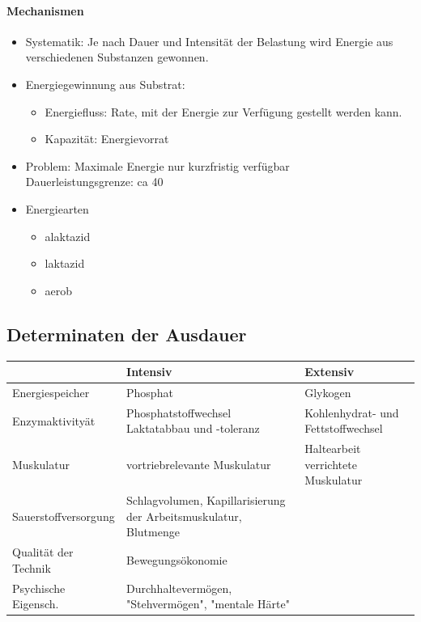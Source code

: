 \paragraph{Mechanismen}
\begin{itemize}
  \item Systematik: Je nach Dauer und Intensität der Belastung wird Energie aus verschiedenen Substanzen gewonnen.
  \item Energiegewinnung aus Substrat:
    \begin{itemize}
      \item Energiefluss: Rate, mit der Energie zur Verfügung gestellt werden kann.
      \item Kapazität: Energievorrat
    \end{itemize}
  \item Problem: Maximale Energie nur kurzfristig verfügbar\\
    Dauerleistungsgrenze: ca 40%
  \item Energiearten
    \begin{itemize}
      \item alaktazid
      \item laktazid
      \item aerob
    \end{itemize}
\end{itemize}

\subsection{Determinaten der Ausdauer}
\begin{centering}
\begin{tabular}{m{} | m{} | m{}}
                          & Intensiv                                                         & Extensiv \\ \hline
     Energiespeicher      & Phosphat                                                         & Glykogen \\ \hline                          
     Enzymaktivityät      & Phosphatstoffwechsel Laktatabbau und -toleranz                   & Kohlenhydrat- und Fettstoffwechsel \\ \hline
     Muskulatur           & vortriebrelevante Muskulatur                                     & Haltearbeit verrichtete Muskulatur \\ \hline
     Sauerstoffversorgung & Schlagvolumen, Kapillarisierung der Arbeitsmuskulatur, Blutmenge \\ \hline
     Qualität der Technik & Bewegungsökonomie \\ \hline                                               
     Psychische Eigensch. & Durchhaltevermögen, "Stehvermögen", "mentale Härte" \\
\end{tabular}
\end{centering}

